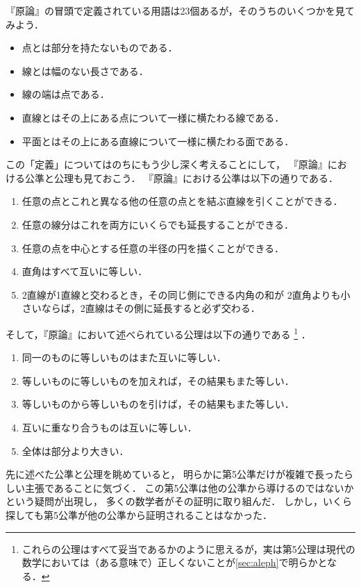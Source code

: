   『原論』の冒頭で定義されている用語は23個あるが，そのうちのいくつかを見てみよう．
  \begin{itemize}
    \item 点とは部分を持たないものである．
    \item 線とは幅のない長さである．
    \item 線の端は点である．
    \item 直線とはその上にある点について一様に横たわる線である．
    \item 平面とはその上にある直線について一様に横たわる面である．
  \end{itemize}
  この「定義」についてはのちにもう少し深く考えることにして，
  『原論』における公準と公理も見ておこう．
  『原論』における公準は以下の通りである．
  \begin{enumerate}[公準1.]
    \item 任意の点とこれと異なる他の任意の点とを結ぶ直線を引くことができる．
    \item 任意の線分はこれを両方にいくらでも延長することができる．
    \item 任意の点を中心とする任意の半径の円を描くことができる．
    \item 直角はすべて互いに等しい．
    \item 2直線が1直線と交わるとき，その同じ側にできる内角の和が
      2直角よりも小さいならば，2直線はその側に延長すると必ず交わる．
  \end{enumerate}
 そして，『原論』において述べられている公理は以下の通りである
 \footnote{これらの公理はすべて妥当であるかのように思えるが，実は第5公理は現代の
 数学においては（ある意味で）正しくないことが\ref{sec:aleph}で明らかとなる．}
 ．
  \begin{enumerate}[公理1.]
    \item 同一のものに等しいものはまた互いに等しい．
    \item 等しいものに等しいものを加えれば，その結果もまた等しい．
    \item 等しいものから等しいものを引けば，その結果もまた等しい．
    \item 互いに重なり合うものは互いに等しい．
    \item 全体は部分より大きい．
  \end{enumerate}
  


  先に述べた公準と公理を眺めていると，
  明らかに第5公準だけが複雑で長ったらしい主張であることに気づく．
  この第5公準は他の公準から導けるのではないかという疑問が出現し，
  多くの数学者がその証明に取り組んだ．
  しかし，いくら探しても第5公準が他の公準から証明されることはなかった．
  

